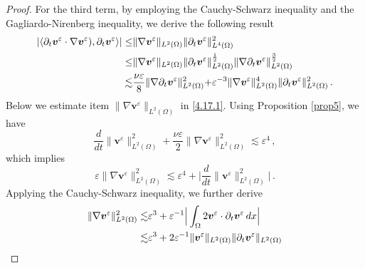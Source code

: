 \documentclass[pdflatex,sn-mathphys-num]{sn-jnl}%
\theoremstyle{thmstyleone}%
\theoremstyle{thmstyletwo}%
\theoremstyle{thmstylethree}%
\theoremstyle{thmstyletwo}
\begin{document}
\begin{proof}
	
	For the third term, by employing the Cauchy-Schwarz inequality and the Gagliardo-Nirenberg inequality, we derive the following result
	\begin{align}\label{4.17.1}
		|\langle
		\partial_t{\boldsymbol v}^{\varepsilon} \cdot \nabla\boldsymbol{v}^\varepsilon)
		,\partial_t{\boldsymbol v}^{\varepsilon}\rangle|
		\leq
		&\lVert
		\nabla{\boldsymbol v}^{\varepsilon} 	\rVert_{{L}^2(\Omega)}
		\lVert
		\partial_t{\boldsymbol v}^{\varepsilon} 	\rVert^2_{{L}^4(\Omega)}
		\notag\\
		\leq &
		\lVert\nabla{\boldsymbol v}^{\varepsilon} 	\rVert_{{L}^2(\Omega)}
		\lVert
		\partial_t{\boldsymbol v}^{\varepsilon} 	\rVert^{\frac12}_{{L}^2(\Omega)}
		\lVert
		\nabla\partial_t{\boldsymbol v}^{\varepsilon} 	\rVert^{\frac32}_{{L}^2(\Omega)}
		\notag\\
		\lesssim&
		\frac{\nu\varepsilon}{8}
		\rVert
		\nabla\partial_t{\boldsymbol v}^{\varepsilon} 	\lVert^{2}_{{L}^2(\Omega)}
		+
		\varepsilon^{-3}
		\lVert\nabla{\boldsymbol v}^{\varepsilon} 	\rVert^4_{{L}^2(\Omega)}
		\lVert
		\partial_t{\boldsymbol v}^{\varepsilon} 	\rVert^{2}_{{L}^2(\Omega)}
		\,.
	\end{align}
	Below we estimate item $\lVert\nabla{\boldsymbol v}^{\varepsilon} 	\rVert_{{L}^2(\Omega)}$ in \eqref{4.17.1}. Using Proposition \ref{prop5}, we have  
	\begin{equation*}
		\frac{d}{dt}\lVert\boldsymbol v^{\varepsilon}\rVert^2_{{L}^2(\Omega)}
		+\frac{\nu\varepsilon}{2}
		\lVert\nabla\boldsymbol v^{\varepsilon}\rVert^2_{{L}^2(\Omega)} \lesssim \varepsilon^4 \,,
	\end{equation*}
	which implies  
	\begin{equation*}
		\varepsilon\lVert\nabla\boldsymbol v^{\varepsilon}\rVert^2_{{L}^2(\Omega)} \lesssim \varepsilon^4 
		+\Big|
		\frac{d}{dt}\lVert\boldsymbol v^{\varepsilon}\rVert^2_{{L}^2(\Omega)}
		\Big|\,.
	\end{equation*} 
	Applying the Cauchy-Schwarz inequality, we further derive 
	\begin{align}\label{3.1.1}
		\lVert\nabla\boldsymbol v^{\varepsilon}\rVert^2_{{L}^2(\Omega)} \lesssim
		& \varepsilon^3 
		+\varepsilon^{-1}\Big|
		\int_{\Omega} 2 \boldsymbol v^{\varepsilon} \cdot {\partial_t}\boldsymbol v^{\varepsilon} \, dx
		\Big|\notag\\
		\lesssim&\varepsilon^3 
		+
		2\varepsilon^{-1}\lVert\boldsymbol v^{\varepsilon}\rVert_{{L}^2(\Omega)}
		\lVert\partial_t\boldsymbol v^{\varepsilon}\rVert_{{L}^2(\Omega)}\notag\\

\end{align}
\end{proof}
\end{document}
